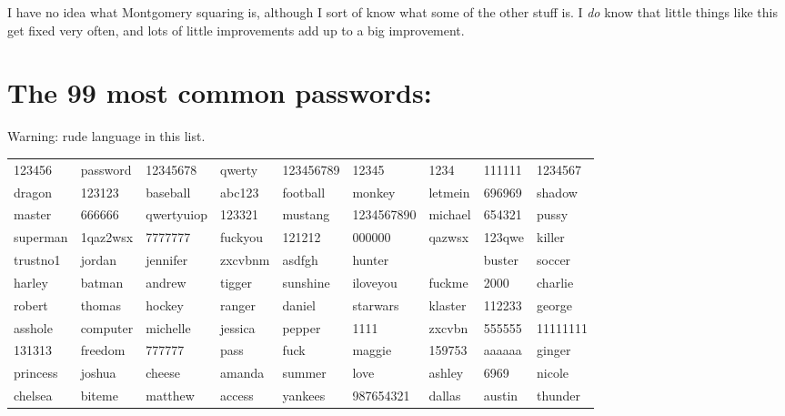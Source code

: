 \documentclass{tufte-handout}
\begin{document}
I have no idea what Montgomery squaring is, although I sort of know
what some of the other stuff is. I \emph{do} know that little things
like this get fixed very often, and lots of little improvements add up
to a big improvement.

\section{The 99 most common passwords:}

Warning: rude language in this list.

\begin{tabular}{lllllllll}

123456 & password & 12345678 & qwerty & 123456789 & 12345 & 1234 & 111111 & 1234567 \\
dragon & 123123 & baseball & abc123 & football & monkey & letmein & 696969 & shadow \\
master & 666666 & qwertyuiop & 123321 & mustang & 1234567890 & michael & 654321 & pussy \\
superman & 1qaz2wsx & 7777777 & fuckyou & 121212 & 000000 & qazwsx & 123qwe & killer \\
trustno1 & jordan & jennifer & zxcvbnm & asdfgh & hunter &  & buster & soccer \\
harley & batman & andrew & tigger & sunshine & iloveyou & fuckme & 2000 & charlie \\
robert & thomas & hockey & ranger & daniel & starwars & klaster & 112233 & george \\
asshole & computer & michelle & jessica & pepper & 1111 & zxcvbn & 555555 & 11111111 \\
131313 & freedom & 777777 & pass & fuck & maggie & 159753 & aaaaaa & ginger \\
princess & joshua & cheese & amanda & summer & love & ashley & 6969 & nicole \\
chelsea & biteme & matthew & access & yankees & 987654321 & dallas & austin & thunder \\
\end{tabular}
\end{document}
